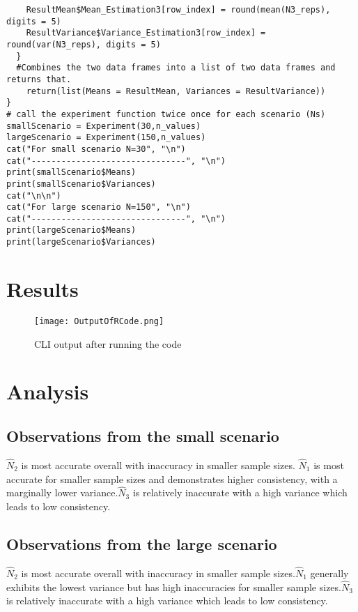 \documentclass{report}
\begin{document}
\begin{verbatim}
    ResultMean$Mean_Estimation3[row_index] = round(mean(N3_reps), digits = 5)
    ResultVariance$Variance_Estimation3[row_index] = round(var(N3_reps), digits = 5) 
  }
  #Combines the two data frames into a list of two data frames and returns that. 
    return(list(Means = ResultMean, Variances = ResultVariance)) 
}
# call the experiment function twice once for each scenario (Ns)
smallScenario = Experiment(30,n_values)
largeScenario = Experiment(150,n_values)
cat("For small scenario N=30", "\n")
cat("-------------------------------", "\n")
print(smallScenario$Means)
print(smallScenario$Variances)
cat("\n\n")
cat("For large scenario N=150", "\n")
cat("-------------------------------", "\n")
print(largeScenario$Means)
print(largeScenario$Variances)
\end{verbatim}

\section{Results}
\begin{figure}[H]
    \centering
    \texttt{[image: OutputOfRCode.png]}
    \caption{CLI output after running the code}
    \label{fig:enter-label}
\end{figure}


\section{Analysis}

\subsection{Observations from the small scenario}


    $\hat{N}_2$ is most accurate overall with inaccuracy in smaller sample sizes. $\hat{N}_1$ is most accurate for smaller sample sizes and demonstrates higher consistency, with a marginally lower variance.$\hat{N}_3$ is relatively inaccurate with a high variance which leads to low consistency. 


\subsection{Observations from the large scenario}


    $\hat{N}_2$ is most accurate overall with inaccuracy in smaller sample sizes.$\hat{N}_1$ generally exhibits the lowest variance but has high inaccuracies for smaller sample sizes.$\hat{N}_3$ is relatively inaccurate with a high variance which leads to low consistency. 
\end{document}
